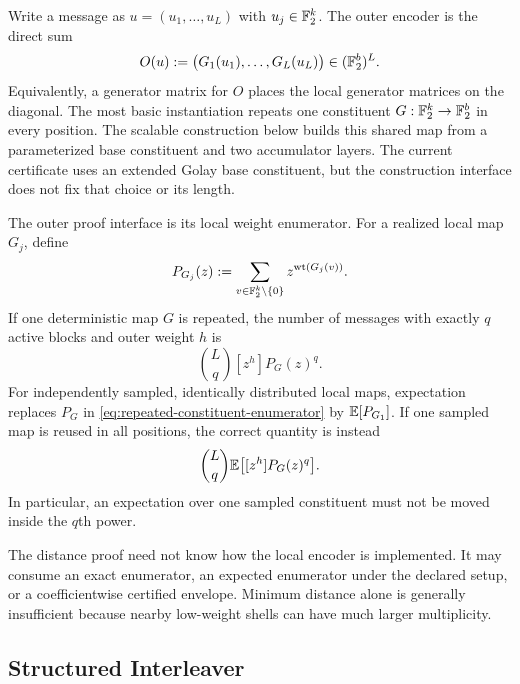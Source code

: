 Write a message as $u=(u_1,\ldots,u_L)$ with
$u_j\in\mathbb F_2^k$. The outer encoder is the direct sum
\begin{equation}
  O(u)
  :=
  \bigl(G_1(u_1),\ldots,G_L(u_L)\bigr)
  \in(\mathbb F_2^b)^L.
  \label{eq:structured-outer}
\end{equation}
Equivalently, a generator matrix for $O$ places the local generator matrices
on the diagonal. The most basic instantiation repeats one constituent
$G:\mathbb F_2^k\to\mathbb F_2^b$ in every position. The scalable construction below builds
this shared map from a parameterized base constituent and two accumulator
layers. The current certificate uses an extended Golay base constituent, but
the construction interface does not fix that choice or its length.

The outer proof interface is its local weight enumerator. For a realized local
map $G_j$, define
\begin{equation}
  P_{G_j}(z)
  :=
  \sum_{v\in\mathbb F_2^k\setminus\{0\}}z^{\operatorname{wt}(G_j(v))}.
  \label{eq:local-constituent-enumerator}
\end{equation}
If one deterministic map $G$ is repeated, the number of messages with exactly
$q$ active blocks and outer weight $h$ is
\begin{equation}
  \binom Lq [z^h]P_G(z)^q.
  \label{eq:repeated-constituent-enumerator}
\end{equation}
For independently sampled, identically distributed local maps, expectation
replaces $P_G$ in \eqref{eq:repeated-constituent-enumerator} by
$\mathbb E[P_{G_1}]$. If one sampled map is reused in all positions, the correct
quantity is instead
\begin{equation}
  \binom Lq\mathbb E\bigl[[z^h]P_G(z)^q\bigr].
  \label{eq:shared-constituent-enumerator}
\end{equation}
In particular, an expectation over one sampled constituent must not be moved
inside the $q$th power.

The distance proof need not know how the local encoder is implemented. It may
consume an exact enumerator, an expected enumerator under the declared setup,
or a coefficientwise certified envelope. Minimum distance alone is generally
insufficient because nearby low-weight shells can have much larger
multiplicity.

\subsection{Structured Interleaver}

